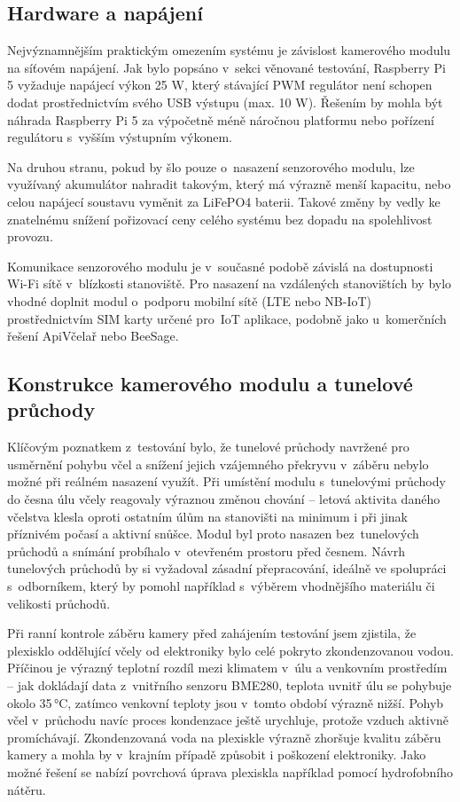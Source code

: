 \subsection*{Hardware a napájení}
Nejvýznamnějším praktickým omezením systému je závislost kamerového modulu na síťovém napájení. Jak bylo popsáno v~sekci věnované testování, Raspberry Pi 5 vyžaduje napájecí výkon 25 W, který stávající PWM regulátor není schopen dodat prostřednictvím svého USB výstupu (max. 10 W). Řešením by mohla být náhrada Raspberry Pi 5 za výpočetně méně náročnou platformu nebo pořízení regulátoru s~vyšším výstupním výkonem.

Na druhou stranu, pokud by šlo pouze o~nasazení senzorového modulu, lze využívaný akumulátor nahradit takovým, který má výrazně menší kapacitu, nebo celou napájecí soustavu vyměnit za LiFePO4 baterii. Takové změny by vedly ke znatelnému snížení pořizovací ceny celého systému bez dopadu na spolehlivost provozu. 

Komunikace senzorového modulu je v~současné podobě závislá na dostupnosti Wi-Fi sítě v~blízkosti stanoviště. Pro nasazení na vzdálených stanovištích by bylo vhodné doplnit modul o~podporu mobilní sítě (LTE nebo NB-IoT) prostřednictvím SIM karty určené pro~IoT aplikace, podobně jako u~komerčních řešení ApiVčelař nebo BeeSage. 

\subsection*{Konstrukce kamerového modulu a tunelové průchody}
Klíčovým poznatkem z~testování bylo, že tunelové průchody navržené pro usměrnění pohybu včel a snížení jejich vzájemného překryvu v~záběru nebylo možné při reálném nasazení využít. Při umístění modulu s~tunelovými průchody do česna úlu včely reagovaly výraznou změnou chování -- letová aktivita daného včelstva klesla oproti ostatním úlům na stanovišti na minimum i při jinak příznivém počasí a aktivní snůšce. Modul byl proto nasazen bez~tunelových průchodů a snímání probíhalo v~otevřeném prostoru před česnem. Návrh tunelových průchodů by si vyžadoval zásadní přepracování, ideálně ve spolupráci s~odborníkem, který by pomohl například s~výběrem vhodnějšího materiálu či velikosti průchodů.

Při ranní kontrole záběru kamery před zahájením testování jsem zjistila, že plexisklo oddělující včely od elektroniky bylo celé pokryto zkondenzovanou vodou. Příčinou je výrazný teplotní rozdíl mezi klimatem v~úlu a venkovním prostředím -- jak dokládají data z~vnitřního senzoru BME280, teplota uvnitř úlu se pohybuje okolo 35\,°C, zatímco venkovní teploty jsou v~tomto období výrazně nižší. Pohyb včel v~průchodu navíc proces kondenzace ještě urychluje, protože vzduch aktivně promíchávají. Zkondenzovaná voda na plexiskle výrazně zhoršuje kvalitu záběru kamery a mohla by v~krajním případě způsobit i poškození elektroniky. Jako možné řešení se nabízí povrchová úprava plexiskla například pomocí hydrofobního nátěru.

